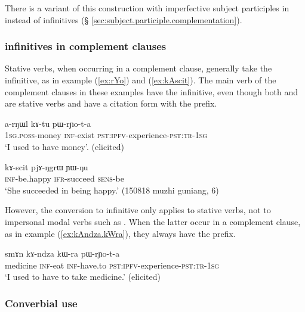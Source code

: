 There is a variant of this construction with imperfective subject participles in  instead of infinitives (§ \ref{sec:subject.participle.complementation}).
\subsubsection{ infinitives in complement clauses}    \label{sec:kW.infinitive}
Stative verbs, when occurring in a complement clause, generally take the  infinitive, as in example  (\ref{ex:rYo}) and (\ref{ex:kAscit}). The main verb of the complement clauses in these examples have the  infinitive, even though both  and  are stative verbs and have a citation form with the  prefix.

\begin{exe}
\ex \label{ex:rYo}
\gll   a-rŋɯl kɤ-tu pɯ-rɲo-t-a \\
\textsc{1sg.poss}-money \textsc{inf}-exist \textsc{pst:ipfv}-experience-\textsc{pst:tr-1sg} \\
\glt `I used to have money'. (elicited)
\end{exe}

\begin{exe}
\ex \label{ex:kAscit}
 \gll  kɤ-scit pjɤ-ŋgrɯ ɲɯ-ŋu  \\
 \textsc{inf}-be.happy \textsc{ifr}-succeed \textsc{sens}-be \\
 \glt `She succeeded in being happy.' (150818 muzhi guniang, 6)
 \end{exe} 
 
However, the conversion to  infinitive only applies to stative verbs, not to  impersonal modal verbs such as . When the latter occur in a complement clause, as in example (\ref{ex:kAndza.kWra}), they always have the  prefix.

\begin{exe}
\ex \label{ex:kAndza.kWra}
\gll  smɤn kɤ-ndza kɯ-ra pɯ-rɲo-t-a  \\ 
medicine \textsc{inf}-eat \textsc{inf}-have.to  \textsc{pst:ipfv}-experience-\textsc{pst:tr-1sg} \\
\glt `I used to have to take medicine.' (elicited)
\end{exe}


\subsubsection{Converbial use}    \label{sec:inf.converb}


